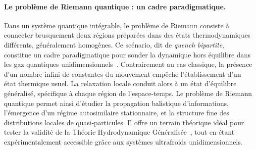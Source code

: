 
\paragraph{Le problème de Riemann quantique : un cadre paradigmatique.}

Dans un système quantique intégrable, le problème de Riemann consiste à connecter brusquement deux régions préparées dans des états thermodynamiques différents, généralement homogènes. Ce scénario, dit de \emph{quench bipartite}, constitue un cadre paradigmatique pour sonder la dynamique hors équilibre dans les gaz quantiques unidimensionnels~\cite{doyon2017lecture,bertini2016transport}. Contrairement au cas classique, la présence d’un nombre infini de constantes du mouvement empêche l’établissement d’un état thermique usuel. La relaxation locale conduit alors à un état d’équilibre généralisé, spécifique à chaque région de l’espace-temps. Le problème de Riemann quantique permet ainsi d’étudier la propagation balistique d’informations, l’émergence d’un régime autosimilaire stationnaire, et la structure fine des distributions locales de quasi-particules. Il offre un terrain théorique idéal pour tester la validité de la Théorie Hydrodynamique Généralisée~\cite{castro2016emergent,doyon2017ghd}, tout en étant expérimentalement accessible grâce aux systèmes ultrafroids unidimensionnels.



